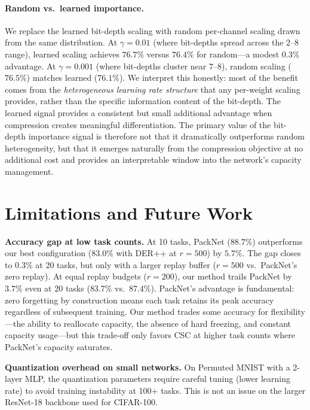 \documentclass[11pt]{article}
\begin{document}
\paragraph{Random vs.\ learned importance.}
We replace the learned bit-depth scaling with random per-channel scaling drawn from the same distribution.
At $\gamma = 0.01$ (where bit-depths spread across the 2--8 range), learned scaling achieves $76.7\%$ versus $76.4\%$ for random---a modest $0.3\%$ advantage.
At $\gamma = 0.001$ (where bit-depths cluster near 7--8), random scaling ($76.5\%$) matches learned ($76.1\%$).
We interpret this honestly: most of the benefit comes from the \textit{heterogeneous learning rate structure} that any per-weight scaling provides, rather than the specific information content of the bit-depth.
The learned signal provides a consistent but small additional advantage when compression creates meaningful differentiation.
The primary value of the bit-depth importance signal is therefore not that it dramatically outperforms random heterogeneity, but that it emerges naturally from the compression objective at no additional cost and provides an interpretable window into the network's capacity management.

\section{Limitations and Future Work}
\label{sec:limitations}

\textbf{Accuracy gap at low task counts.}
At 10 tasks, PackNet ($88.7\%$) outperforms our best configuration ($83.0\%$ with DER++ at $r=500$) by $5.7\%$.
The gap closes to $0.3\%$ at 20 tasks, but only with a larger replay buffer ($r=500$ vs.\ PackNet's zero replay).
At equal replay budgets ($r=200$), our method trails PackNet by $3.7\%$ even at 20 tasks ($83.7\%$ vs.\ $87.4\%$).
PackNet's advantage is fundamental: zero forgetting by construction means each task retains its peak accuracy regardless of subsequent training.
Our method trades some accuracy for flexibility---the ability to reallocate capacity, the absence of hard freezing, and constant capacity usage---but this trade-off only favors CSC at higher task counts where PackNet's capacity saturates.

\textbf{Quantization overhead on small networks.}
On Permuted MNIST with a 2-layer MLP, the quantization parameters require careful tuning (lower learning rate) to avoid training instability at 100+ tasks.
This is not an issue on the larger ResNet-18 backbone used for CIFAR-100.
\end{document}
